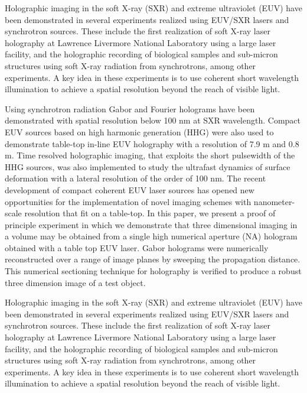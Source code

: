 \documentclass[]{IEEEphot}
\begin{document}
Holographic imaging in the soft X-ray (SXR) and extreme ultraviolet (EUV) have been demonstrated in several experiments realized using EUV/SXR lasers and synchrotron sources. These include the first realization of soft X-ray laser holography at Lawrence Livermore National Laboratory using a large laser facility, and the holographic recording of biological samples and sub-micron structures using soft X-ray radiation from synchrotrons, among other experiments.  A key idea in these experiments is to use coherent short wavelength illumination to achieve a spatial resolution beyond the reach of visible light.  

Using synchrotron radiation Gabor and Fourier holograms have been demonstrated with spatial resolution below 100 nm at SXR wavelength.  Compact EUV sources based on high harmonic generation (HHG) were also used to demonstrate table-top in-line EUV holography with a  resolution of 7.9 m and 0.8 m.  Time resolved holographic imaging, that exploits the short pulsewidth of the HHG sources, was also implemented to study the ultrafast dynamics of surface deformation with a lateral resolution of the order of 100 nm.  The recent development of compact coherent EUV laser sources has opened new opportunities for the implementation of novel imaging schemes with nanometer-scale resolution that fit on a table-top. In this paper, we present a proof of principle experiment in which we demonstrate that three dimensional imaging in a volume may be obtained from a single high numerical  aperture (NA) hologram obtained with a table top EUV laser. Gabor holograms were numerically reconstructed over a range of image planes by sweeping the propagation distance. This numerical sectioning technique for holography is verified to produce a robust three dimension image of a test object.  

Holographic imaging in the soft X-ray (SXR) and extreme ultraviolet (EUV) have been demonstrated in several experiments realized using EUV/SXR lasers and synchrotron sources. These include the first realization of soft X-ray laser holography at Lawrence Livermore National Laboratory using a large laser facility, and the holographic recording of biological samples and sub-micron structures using soft X-ray radiation from synchrotrons, among other experiments.  A key idea in these experiments is to use coherent short wavelength illumination to achieve a spatial resolution beyond the reach of visible light.  
\end{document}
